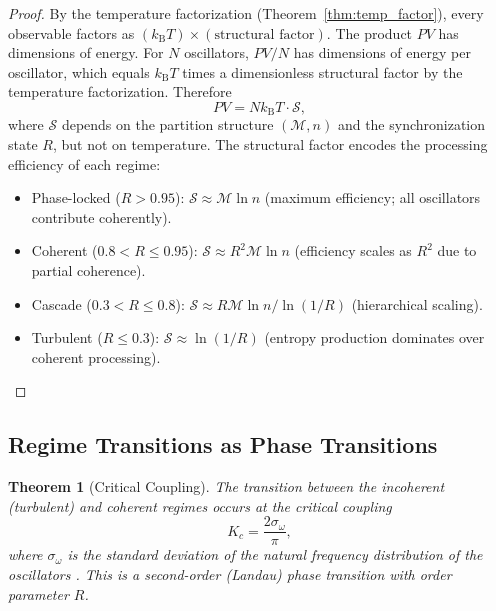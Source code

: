 \documentclass[twocolumn,10pt]{article}
\newtheorem{theorem}{Theorem}[section]
\theoremstyle{remark}
\newcommand{\kB}{k_{\mathrm{B}}}
\newcommand{\Depth}{\mathcal{M}}
\begin{document}
\begin{proof}
By the temperature factorization (Theorem~\ref{thm:temp_factor}), every observable factors as $(\kB T) \times (\text{structural factor})$. The product $PV$ has dimensions of energy. For $N$ oscillators, $PV / N$ has dimensions of energy per oscillator, which equals $\kB T$ times a dimensionless structural factor by the temperature factorization. Therefore
\begin{equation}
PV = N\kB T \cdot \mathcal{S},
\end{equation}
where $\mathcal{S}$ depends on the partition structure $(\Depth, n)$ and the synchronization state $R$, but not on temperature. The structural factor encodes the processing efficiency of each regime:
\begin{itemize}
\item Phase-locked ($R > 0.95$): $\mathcal{S} \approx \Depth \ln n$ (maximum efficiency; all oscillators contribute coherently).
\item Coherent ($0.8 < R \leq 0.95$): $\mathcal{S} \approx R^2 \Depth \ln n$ (efficiency scales as $R^2$ due to partial coherence).
\item Cascade ($0.3 < R \leq 0.8$): $\mathcal{S} \approx R \Depth \ln n / \ln(1/R)$ (hierarchical scaling).
\item Turbulent ($R \leq 0.3$): $\mathcal{S} \approx \ln(1/R)$ (entropy production dominates over coherent processing).
\end{itemize}
\end{proof}

\subsection{Regime Transitions as Phase Transitions}

\begin{theorem}[Critical Coupling]
\label{thm:critical_coupling}
The transition between the incoherent (turbulent) and coherent regimes occurs at the critical coupling
\begin{equation}
K_c = \frac{2\sigma_\omega}{\pi},
\label{eq:critical_coupling}
\end{equation}
where $\sigma_\omega$ is the standard deviation of the natural frequency distribution of the oscillators \cite{kuramoto1984,strogatz2000}. This is a second-order (Landau) phase transition with order parameter $R$.
\end{theorem}
\end{document}
